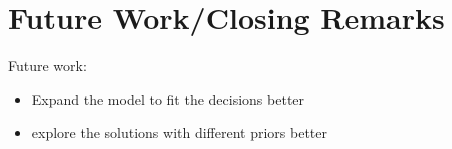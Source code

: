 \chapter{Future Work/Closing Remarks}

Future work:
\begin{itemize}
    \item Expand the model to fit the decisions better
    \item explore the solutions with different priors better
\end{itemize}